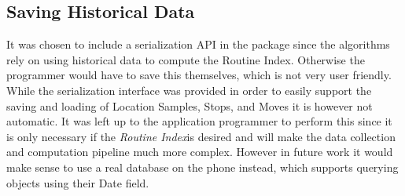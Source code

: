 \subsection{Saving Historical Data}
It was chosen to include a serialization API in the package since the algorithms rely on using historical data to compute the Routine Index. Otherwise the programmer would have to save this themselves, which is not very user friendly. While the serialization interface was provided in order to easily support the saving and loading of Location Samples, Stops, and Moves it is however not automatic. It was left up to the application programmer to perform this since it is only necessary if the \textit{Routine Index}is desired and will make the data collection and computation pipeline much more complex. However in future work it would make sense to use a real database on the phone instead, which supports querying objects using their Date field.  
